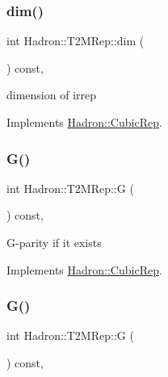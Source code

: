 \subsubsection{\texorpdfstring{dim()}{dim()}\hspace{0.1cm}{\footnotesize\ttfamily [3/3]}}
{\footnotesize\ttfamily int Hadron\+::\+T2\+M\+Rep\+::dim (\begin{DoxyParamCaption}{ }\end{DoxyParamCaption}) const\hspace{0.3cm}{\ttfamily [inline]}, {\ttfamily [virtual]}}

dimension of irrep 

Implements \mbox{\hyperlink{structHadron_1_1CubicRep_ac178d14064f037a66af4b9fb4b312d51}{Hadron\+::\+Cubic\+Rep}}.

\mbox{\label{structHadron_1_1T2MRep_a1876c1f6b93ff7a6d230f1c8f9678506}} 
\subsubsection{\texorpdfstring{G()}{G()}\hspace{0.1cm}{\footnotesize\ttfamily [1/3]}}
{\footnotesize\ttfamily int Hadron\+::\+T2\+M\+Rep\+::G (\begin{DoxyParamCaption}{ }\end{DoxyParamCaption}) const\hspace{0.3cm}{\ttfamily [inline]}, {\ttfamily [virtual]}}

G-\/parity if it exists 

Implements \mbox{\hyperlink{structHadron_1_1CubicRep_a52104e43266d1614c00bbd1c3b395458}{Hadron\+::\+Cubic\+Rep}}.

\mbox{\label{structHadron_1_1T2MRep_a1876c1f6b93ff7a6d230f1c8f9678506}} 
\subsubsection{\texorpdfstring{G()}{G()}\hspace{0.1cm}{\footnotesize\ttfamily [2/3]}}
{\footnotesize\ttfamily int Hadron\+::\+T2\+M\+Rep\+::G (\begin{DoxyParamCaption}{ }\end{DoxyParamCaption}) const\hspace{0.3cm}{\ttfamily [inline]}, {\ttfamily [virtual]}}

